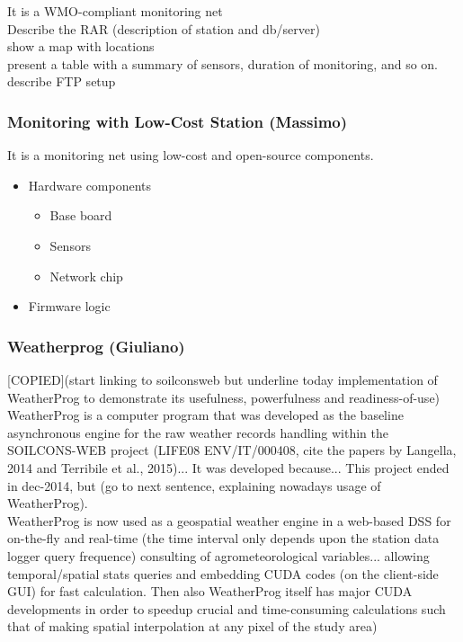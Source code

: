 \documentclass[authoryear,preprint,review,12pt]{elsarticle}
\begin{document}
It is a WMO-compliant monitoring net\\
Describe the RAR (description of station and db/server)\\
show a map with locations\\
present a table with a summary of sensors, duration of monitoring, and so on. \\
describe FTP setup


\subsubsection{Monitoring with Low-Cost Station (Massimo)}
It is a monitoring net using low-cost and open-source components.

\begin{itemize}
    \item Hardware components
    \begin{itemize}
        \item Base board
        \item Sensors
        \item Network chip
    \end{itemize}
    \item Firmware logic
\end{itemize}

\subsubsection{Weatherprog (Giuliano)}
[COPIED](start linking to soilconsweb but underline today implementation of WeatherProg to demonstrate its usefulness, powerfulness and readiness-of-use)\\
WeatherProg is a computer program that was developed as the baseline asynchronous engine for the raw weather records handling within the SOILCONS-WEB project (LIFE08 ENV/IT/000408, cite the papers by Langella, 2014 and Terribile et al., 2015)... 
It was developed because... 
This project ended in dec-2014, but (go to next sentence, explaining nowadays usage of WeatherProg).\\
WeatherProg is now used as a geospatial weather engine in a web-based DSS for on-the-fly and real-time (the time interval only depends upon the station data logger query frequence) consulting of agrometeorological variables... allowing temporal/spatial stats queries and embedding CUDA codes (on the client-side GUI) for fast calculation. Then also WeatherProg itself has major CUDA developments in order to speedup crucial and time-consuming calculations such that of making spatial interpolation at any pixel of the study area)\\
\end{document}
